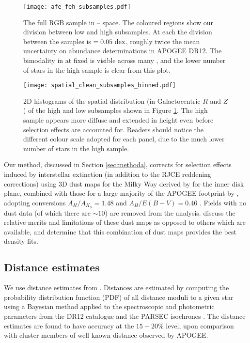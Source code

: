 \begin{figure}
 \centering
	\texttt{[image: afe\_feh\_subsamples.pdf]}
    \caption{The full RGB sample in \afe{}--\feh{} space. The coloured regions show our division between low and high \afe{} subsamples. At each \feh{} the division between the samples is \afe{} $= 0.05 \ \rm{dex}$, roughly twice the mean uncertainty on \afe{} abundance determinations in APOGEE DR12. The bimodality in \afe{} at fixed \feh{} is visible across many \feh{}, and the lower number of stars in the high \afe{} sample is clear from this plot.}
    \label{fig:afe_feh}
\end{figure}


\begin{figure}
\centering
	\texttt{[image: spatial\_clean\_subsamples\_binned.pdf]}
    \caption{2D histograms of the spatial distribution (in Galactocentric $R$ and $Z$) of the high and low \afe{} subsamples shown in Figure \ref{fig:afe_feh}. The high \afe{} sample appears more diffuse and extended in height even before selection effects are accounted for. Readers should notice the different colour scale adopted for each panel, due to the much lower number of stars in the high \afe{} sample.}
    \label{fig:spatial}
\end{figure}

Our method, discussed in Section \ref{sec:methoda}, corrects for selection effects induced by interstellar extinction (in addition to the RJCE reddening corrections) using 3D dust maps for the Milky Way derived by \citet{2006A&A...453..635M} for the inner disk plane, combined with those for a large majority of the APOGEE footprint by \citep{2015ApJ...810...25G}, adopting conversions $A_H/A_{K_S}=1.48$ and $A_H/E(B-V) = 0.46$ \citep{2011ApJ...737..103S,2013MNRAS.430.2188Y}.  Fields with no dust data (of which there are $\sim 10$) are removed from the analysis. \citet{2016ApJ...823...30B} discuss the relative merits and limitations of these dust maps as opposed to others which are available, and determine that this combination of dust maps provides the best density fits.


\subsection{Distance estimates}
\label{sec:distances}
We use distance estimates from \citet{2014AJ....147..116H} \citep[But see also][for further description]{2015ApJ...808..132H}. Distances are estimated by computing the probability distribution function (PDF) of all distance moduli to a given star using a Bayesian method applied to the spectroscopic and photometric parameters from the DR12 catalogue and the PARSEC isochrones \citep{2012MNRAS.427..127B}. The distance estimates are found to have accuracy at the $15-20\%$ level, upon comparison with cluster members of well known distance observed by APOGEE. 

